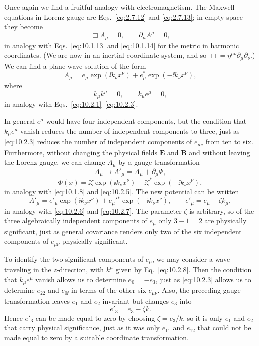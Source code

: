 Once again we find a fruitful analogy with electromagnetism. The Maxwell
equations in Lorenz gauge are Eqs.~\eqref{eq:2.7.12} and
\eqref{eq:2.7.13}; in empty space they become
\[
  \Box A_\mu=0,
  \qquad
  \partial_\mu A^\mu=0,
\]
in analogy with Eqs.~\eqref{eq:10.1.13} and \eqref{eq:10.1.14} for the
metric in harmonic coordinates. (We are now in an inertial coordinate
system, and so \(\Box=\eta^{\mu\nu}\partial_\mu\partial_\nu\).) We can find
a plane-wave solution of the form
\[
  A_\mu
  =
  e_\mu\exp(\ii k_\nu x^\nu)
  +e_\mu^*\exp(-\ii k_\nu x^\nu),
\]
where
\[
  k_\mu k^\mu=0,
  \qquad
  k_\mu e^\mu=0,
\]
in analogy with Eqs.~\eqref{eq:10.2.1}--\eqref{eq:10.2.3}.

In general \(e^\mu\) would have four independent components, but the
condition that \(k_\mu e^\mu\) vanish reduces the number of independent
components to three, just as \eqref{eq:10.2.3} reduces the number of
independent components of \(e_{\mu\nu}\) from ten to six. Furthermore,
without changing the physical fields \(\mathbf{E}\) and \(\mathbf{B}\) and
without leaving the Lorenz gauge, we can change \(A_\mu\) by a gauge
transformation
\[
  A_\mu\longrightarrow A'_\mu=A_\mu+\partial_\mu\Phi,
\]
\[
  \Phi(x)
  =
  \ii\zeta\exp(\ii k_\nu x^\nu)
  -\ii\zeta^*\exp(-\ii k_\nu x^\nu),
\]
in analogy with \eqref{eq:10.1.8} and \eqref{eq:10.2.5}. The new potential
can be written
\[
  A'_\mu
  =
  e'_\mu\exp(\ii k_\nu x^\nu)
  +e_\mu'{}^*\exp(-\ii k_\nu x^\nu),
  \qquad
  e'_\mu=e_\mu-\zeta k_\mu,
\]
in analogy with \eqref{eq:10.2.6} and \eqref{eq:10.2.7}. The parameter
\(\zeta\) is arbitrary, so of the three algebraically independent components
of \(e_\mu\) only \(3-1=2\) are physically significant, just as general
covariance renders only two of the six independent components of
\(e_{\mu\nu}\) physically significant.

To identify the two significant components of \(e_\mu\), we may consider a
wave traveling in the \(z\)-direction, with \(k^\mu\) given by
Eq.~\eqref{eq:10.2.8}. Then the condition that \(k_\mu e^\mu\) vanish allows
us to determine \(e_0=-e_3\), just as \eqref{eq:10.2.3} allows us to
determine \(e_{22}\) and \(e_{0\ii}\) in terms of the other six
\(e_{\mu\nu}\). Also, the preceding gauge transformation leaves \(e_1\) and
\(e_2\) invariant but changes \(e_3\) into
\[
  e'_3=e_3-\zeta k.
\]
Hence \(e'_3\) can be made equal to zero by choosing \(\zeta=e_3/k\), so it
is only \(e_1\) and \(e_2\) that carry physical significance, just as it was
only \(e_{11}\) and \(e_{12}\) that could not be made equal to zero by a
suitable coordinate transformation.


